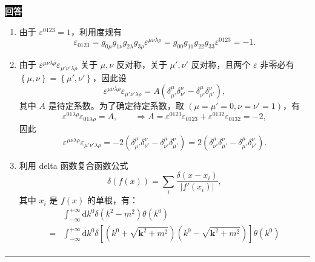 \documentclass[11pt,a4paper]{ctexart}
\newenvironment{answer}
  {\par\smallskip\noindent
   \begingroup
   \setlength{\fboxsep}{4pt}%
   \colorbox{black}{\textcolor{white}{\bfseries 回答}}%
   \endgroup
   \quad\ignorespaces}
  {\par\smallskip\noindent\rule{\linewidth}{0.4pt}\medskip}
\begin{document}
\begin{answer}
  \begin{enumerate}[label=(1.3.\arabic*),ref=1.3.\arabic*,leftmargin=4.5em]
    \item 由于 $\varepsilon^{0123}=1 $，利用度规有
    \begin{equation}
      \varepsilon_{0123}
      =g_{0\mu}g_{1\nu}g_{2\lambda}g_{3\rho} \varepsilon^{\mu\nu\lambda\rho}
      =g_{00}g_{11}g_{22}g_{33} \varepsilon^{0123}
      =-1.
    \end{equation}
    \item 由于 $\varepsilon^{\mu\nu\lambda\rho}\varepsilon_{\mu'\nu'\lambda\rho} $ 关于 $\mu,\nu $ 反对称，关于 $\mu',\nu' $ 反对称，且两个 $\varepsilon $ 非零必有 $\left\{\mu,\nu \right\}=\left\{\mu',\nu' \right\} $，因此设
    \begin{equation}
      \varepsilon^{\mu\nu\lambda\rho}\varepsilon_{\mu'\nu'\lambda\rho}
      =A \left(\delta^\mu_{\mu'}\delta^{\nu}_{\nu'} - \delta^{\mu}_{\nu'} \delta^{\nu}_{\mu'} \right),
    \end{equation}
    其中 $A $ 是待定系数。为了确定待定系数，取 $(\mu=\mu'=0,\nu=\nu'=1) $，有
    \begin{equation}
      \varepsilon^{01\lambda\rho}\varepsilon_{01\lambda\rho}
      =A,\qquad
      \Longrightarrow
      A
      =\varepsilon^{0123} \varepsilon_{0123} + \varepsilon^{0132}\varepsilon_{0132}
      =-2,
    \end{equation}
    因此
    \begin{equation}
      \varepsilon^{\mu\nu\lambda\rho}\varepsilon_{\mu'\nu'\lambda\rho}
      =-2 \left(\delta^\mu_{\mu'}\delta^{\nu}_{\nu'} - \delta^{\mu}_{\nu'} \delta^{\nu}_{\mu'} \right)      
      =2\left(\delta^\mu_{\nu'}\delta^\nu_{\mu'}-\delta^\mu_{\mu'}\delta^\nu_{\nu'}\right).
    \end{equation}
    \item 利用 delta 函数复合函数公式
    \begin{equation}
      \delta\left(f(x) \right)
      =\sum_{i} \frac{\delta(x-x_i) }{\left|f'(x_i) \right| }, 
    \end{equation}
    其中 $x_i $ 是 $f(x) $ 的单根，有：
    \begin{equation}
      \begin{aligned}
        &\int_{-\infty}^{+\infty}\mathrm{d}k^0\delta\left(k^2-m^2\right)\theta\left(k^0\right) \\
        =&\int_{-\infty}^{+\infty}\mathrm{d}k^0\delta\left[\left(k^0+\sqrt{\bm{k}^2+m^2} \right)\left(k^0-\sqrt{\bm{k}^2+m^2} \right)\right]\theta\left(k^0\right) \\

\end{aligned}
\end{equation}
\end{enumerate}
\end{answer}
\end{document}
